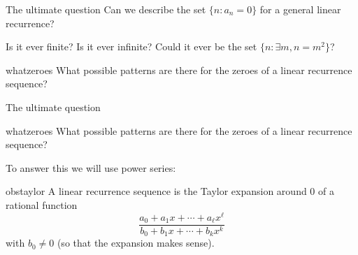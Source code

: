 \documentclass[notheorems]{beamer}
\theoremstyle{plain}
\begin{document}
\begin{frame}{The ultimate question}
    Can we describe the set
    \(\{n :a_n= 0\}\)
    for a general linear recurrence?

    Is it ever finite?
    \pause
    Is it ever infinite?
    \pause
    Could it ever be the set $\{n : \exists m, n = m^2\}$?
    \pause
    \begin{question}{}{whatzeroes}
        What possible patterns are there for the zeroes of a linear recurrence sequence?
    \end{question}
\end{frame}

\begin{frame}{The ultimate question}
    \begin{question}{}{whatzeroes}
        What possible patterns are there for the zeroes of a linear recurrence sequence?
    \end{question}

    To answer this we will use power series:
    \begin{observation}{}{obstaylor}
        A linear recurrence sequence is the Taylor expansion around 0 of a rational function
        \begin{equation*}
            \frac{a_0  + a_1 x+ \cdots + a_\ell x^\ell}{b_0 + b_1 x + \cdots + b_k x^k}
        \end{equation*}
        with \(b_0 \ne 0\) (so that the expansion makes sense).%
    \end{observation}
\end{frame}
\end{document}
